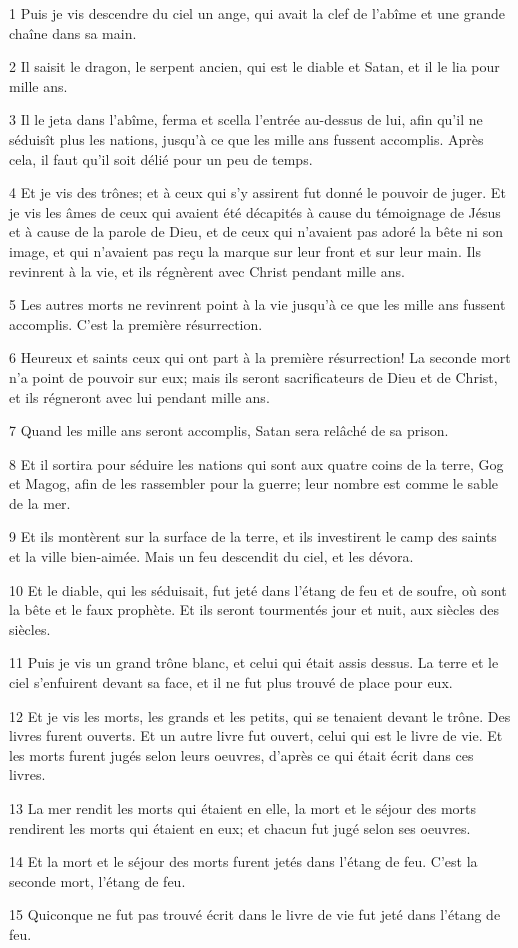 \par 1 Puis je vis descendre du ciel un ange, qui avait la clef de l'abîme et une grande chaîne dans sa main.
\par 2 Il saisit le dragon, le serpent ancien, qui est le diable et Satan, et il le lia pour mille ans.
\par 3 Il le jeta dans l'abîme, ferma et scella l'entrée au-dessus de lui, afin qu'il ne séduisît plus les nations, jusqu'à ce que les mille ans fussent accomplis. Après cela, il faut qu'il soit délié pour un peu de temps.
\par 4 Et je vis des trônes; et à ceux qui s'y assirent fut donné le pouvoir de juger. Et je vis les âmes de ceux qui avaient été décapités à cause du témoignage de Jésus et à cause de la parole de Dieu, et de ceux qui n'avaient pas adoré la bête ni son image, et qui n'avaient pas reçu la marque sur leur front et sur leur main. Ils revinrent à la vie, et ils régnèrent avec Christ pendant mille ans.
\par 5 Les autres morts ne revinrent point à la vie jusqu'à ce que les mille ans fussent accomplis. C'est la première résurrection.
\par 6 Heureux et saints ceux qui ont part à la première résurrection! La seconde mort n'a point de pouvoir sur eux; mais ils seront sacrificateurs de Dieu et de Christ, et ils régneront avec lui pendant mille ans.
\par 7 Quand les mille ans seront accomplis, Satan sera relâché de sa prison.
\par 8 Et il sortira pour séduire les nations qui sont aux quatre coins de la terre, Gog et Magog, afin de les rassembler pour la guerre; leur nombre est comme le sable de la mer.
\par 9 Et ils montèrent sur la surface de la terre, et ils investirent le camp des saints et la ville bien-aimée. Mais un feu descendit du ciel, et les dévora.
\par 10 Et le diable, qui les séduisait, fut jeté dans l'étang de feu et de soufre, où sont la bête et le faux prophète. Et ils seront tourmentés jour et nuit, aux siècles des siècles.
\par 11 Puis je vis un grand trône blanc, et celui qui était assis dessus. La terre et le ciel s'enfuirent devant sa face, et il ne fut plus trouvé de place pour eux.
\par 12 Et je vis les morts, les grands et les petits, qui se tenaient devant le trône. Des livres furent ouverts. Et un autre livre fut ouvert, celui qui est le livre de vie. Et les morts furent jugés selon leurs oeuvres, d'après ce qui était écrit dans ces livres.
\par 13 La mer rendit les morts qui étaient en elle, la mort et le séjour des morts rendirent les morts qui étaient en eux; et chacun fut jugé selon ses oeuvres.
\par 14 Et la mort et le séjour des morts furent jetés dans l'étang de feu. C'est la seconde mort, l'étang de feu.
\par 15 Quiconque ne fut pas trouvé écrit dans le livre de vie fut jeté dans l'étang de feu.

